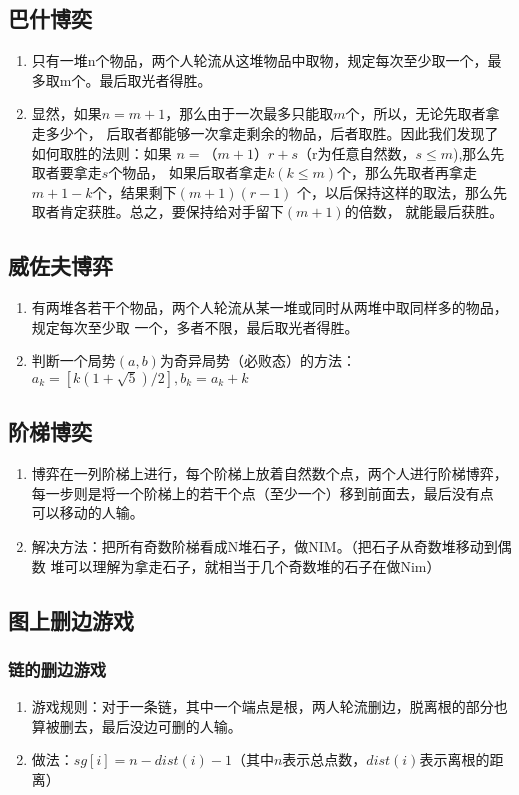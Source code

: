 \subsection*{巴什博奕}
	\begin{enumerate}
		\item 
			只有一堆n个物品，两个人轮流从这堆物品中取物，规定每次至少取一个，最多取m个。最后取光者得胜。
		\item
			显然，如果$n=m+1$，那么由于一次最多只能取$m$个，所以，无论先取者拿走多少个，
			后取者都能够一次拿走剩余的物品，后者取胜。因此我们发现了如何取胜的法则：如果
			$n=（m+1）r+s（$r为任意自然数，$s \leq m$),那么先取者要拿走$s$个物品，
			如果后取者拿走$k(k \leq m)$个，那么先取者再拿走$m+1-k$个，结果剩下$(m+1)(r-1)$
			个，以后保持这样的取法，那么先取者肯定获胜。总之，要保持给对手留下$(m+1)$的倍数，
			就能最后获胜。
	\end{enumerate}
\subsection*{威佐夫博弈}
	\begin{enumerate}
		\item 
			有两堆各若干个物品，两个人轮流从某一堆或同时从两堆中取同样多的物品，规定每次至少取
			一个，多者不限，最后取光者得胜。
		\item
			判断一个局势$(a, b)$为奇异局势（必败态）的方法：
			$a_k =[k (1+\sqrt{5})/2],b_k= a_k + k$
	\end{enumerate}
\subsection*{阶梯博奕}
	\begin{enumerate}
		\item
			博弈在一列阶梯上进行，每个阶梯上放着自然数个点，两个人进行阶梯博弈，
			每一步则是将一个阶梯上的若干个点（至少一个）移到前面去，最后没有点
			可以移动的人输。
		\item
			解决方法：把所有奇数阶梯看成N堆石子，做NIM。（把石子从奇数堆移动到偶数
			堆可以理解为拿走石子，就相当于几个奇数堆的石子在做Nim）
	\end{enumerate}
\subsection*{图上删边游戏}
	\subsubsection*{链的删边游戏}
		\begin{enumerate}
			\item
				游戏规则：对于一条链，其中一个端点是根，两人轮流删边，脱离根的部分也算被删去，最后没边可删的人输。
			\item
				做法：$sg[i] = n - dist(i) - 1$（其中$n$表示总点数，$dist(i)$表示离根的距离）
		\end{enumerate}
